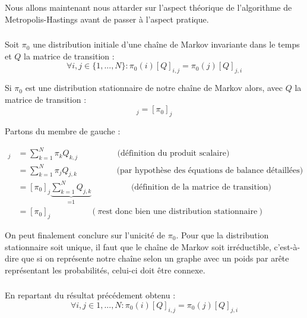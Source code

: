 Nous allons maintenant nous attarder sur l'aspect théorique de l'algorithme de 
Metropolis-Hastings avant de passer à l'aspect pratique.

\subsubsection{}
Soit $\pi_0$ une distribution initiale d'une chaîne de Markov invariante dans le temps et $Q$ la
matrice de transition :
\begin{equation*}
  \forall i,j \in \{1,...,N\} : \pi_0(i)[Q]_{i,j} = \pi_0(j)[Q]_{j,i}
\end{equation*}

Si $\pi_0$ est une distribution stationnaire de notre chaîne de Markov alors, avec $Q$ la matrice de
transition :
\begin{equation}
  [\pi_0 Q]_j = [\pi_0]_j
\end{equation}

Partons du membre de gauche :

\begin{align*}
  [\pi_0 Q]_j &= \sum_{k = 1}^N \pi_k Q_{k,j} \hspace{2cm} \text{(définition du produit scalaire)}\\
              &= \sum_{k = 1}^N \pi_j Q_{j,k} \hspace{2cm} \text{(par hypothèse des équations de balance détaillées)}\\
              &= [\pi_0]_j \underbrace{\sum_{k=1}^N Q_{j,k}}_\textrm{=1} \hspace{2cm} \text{(définition de la matrice de transition)}\\
              &= [\pi_0]_j \hspace{2cm} (\pi \text{est donc bien une distribution stationnaire})
\end{align*}

On peut finalement conclure sur l'unicité de $\pi_0$. Pour que la distribution stationnaire soit unique, il faut que le chaîne de Markov soit irréductible, c'est-à-dire que 
si on représente notre chaîne selon un graphe avec un poids par arête représentant les probabilités, celui-ci doit être connexe.

\subsubsection{}
En repartant du résultat précédement obtenu :
\begin{equation*}
  \forall i,j \in {1,...,N} : \pi_0(i)[Q]_{i,j} = \pi_0(j)[Q]_{j,i}
\end{equation*}

